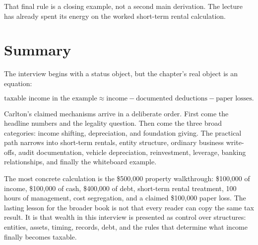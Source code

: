That final rule is a closing example, not a second main derivation. The lecture has already spent its energy on the worked short-term rental calculation.

\section{Summary}

The interview begins with a status object, but the chapter's real object is an equation:

\begin{equation}
\text{taxable income in the example}
\approx
\text{income}
-
\text{documented deductions}
-
\text{paper losses}.
\end{equation}

Carlton's claimed mechanisms arrive in a deliberate order. First come the headline numbers and the legality question. Then come the three broad categories: income shifting, depreciation, and foundation giving. The practical path narrows into short-term rentals, entity structure, ordinary business write-offs, audit documentation, vehicle depreciation, reinvestment, leverage, banking relationships, and finally the whiteboard example.

The most concrete calculation is the \$500,000 property walkthrough: \$100,000 of income, \$100,000 of cash, \$400,000 of debt, short-term rental treatment, 100 hours of management, cost segregation, and a claimed \$100,000 paper loss. The lasting lesson for the broader book is not that every reader can copy the same tax result. It is that wealth in this interview is presented as control over structures: entities, assets, timing, records, debt, and the rules that determine what income finally becomes taxable.